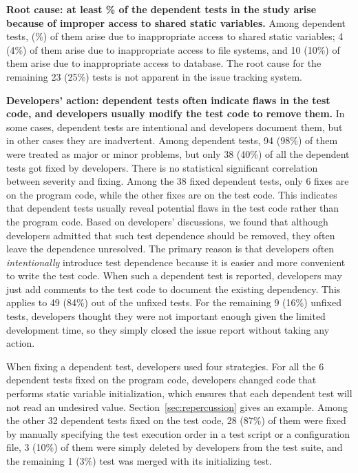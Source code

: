 \vspace{1mm}
\noindent \textbf{{Root cause: at least \svratio\% of the dependent tests
in the study arise because of improper access to shared static
variables.}} Among \dtnum dependent tests, \svnum (\svratio\%) of them
arise due to inappropriate access to
shared static variables; 4 (4\%) of them arise
due to inappropriate access to file systems, and 10 (10\%) of them arise
due to inappropriate access to database.
The root cause for the remaining 23 (25\%) tests is not apparent
in the issue tracking system.

\vspace{1mm}
\noindent \textbf{{Developers' action: dependent tests
often indicate flaws in the test code, and developers usually
modify the test code to remove them.}}
In some cases, dependent tests are intentional and developers
document them, but in other cases they are
inadvertent. Among \dtnum dependent tests,
94 (98\%) of them were treated as major or minor problems,
but only 38 (40\%) of all the \dtnum dependent tests
got fixed by developers. There is no statistical
significant correlation between severity and fixing.
Among the 38 fixed dependent tests, only 6 fixes are
on the program code, while the other fixes are on the
test code. This indicates that dependent tests usually
reveal potential flaws in the test code rather than the program code.
Based on developers' discussions, we found that although
developers admitted that such test dependence should be removed,
they often leave the dependence unresolved.
The primary reason is that developers often \textit{intentionally}
introduce test dependence because it is
easier and more convenient to write the test code. When such a dependent
test is reported, developers may just add comments to the test code
to document the existing dependency. This applies to 49 (84\%) out
of the \unfixed unfixed tests. For the remaining 9 (16\%) unfixed tests,
developers thought they were not important enough given the limited
development time, so they simply closed the issue report without taking
any action.


When fixing a dependent test, developers used
four strategies. For all the 6 dependent tests
fixed on the program code, developers changed
code that performs static variable initialization, which ensures that
each dependent test will not read an undesired value.
Section~\ref{sec:repercussion} gives an example.
Among the other 32 dependent tests fixed on the test code,
28 (87\%) of them were fixed by manually specifying
the test execution order in a test script or a configuration file,
3 (10\%) of them were simply deleted by developers
from the test suite, and the remaining 1 (3\%) test was merged with its
initializing test.



